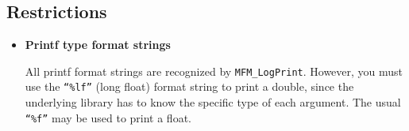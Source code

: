 \subsection{Restrictions}

\begin{itemize}
\item{\bf Printf type format strings}

All printf format strings are recognized by {\tt MFM\_LogPrint}.
However, you must use the {\tt ``\%lf''} (long float) format string to print a double,
since the underlying library has to know the specific type of each argument.
The usual {\tt ``\%f''} may be used to print a float.
\end{itemize}

